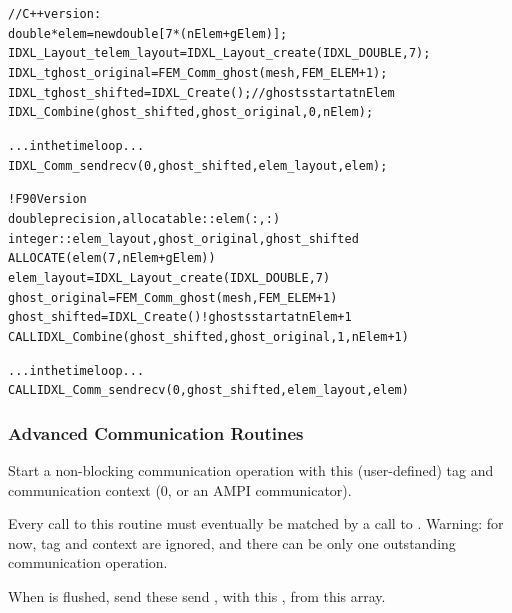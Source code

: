 \begin{alltt}
// C++ version:
     double *elem=new double[7*(nElem+gElem)];
     IDXL\_Layout\_t elem\_layout=IDXL\_Layout\_create(IDXL\_DOUBLE,7);
     IDXL\_t ghost\_original=FEM_Comm_ghost(mesh,FEM_ELEM+1);
     IDXL\_t ghost\_shifted=IDXL_Create(); // ghosts start at nElem
     IDXL_Combine(ghost_shifted,ghost_original,0,nElem);
     
     ... in the time loop ...
         IDXL_Comm_sendrecv(0,ghost_shifted,elem_layout,elem);

! F90 Version
     double precision, allocatable :: elem(:,:)
     integer :: elem\_layout, ghost_original,ghost_shifted
     ALLOCATE(elem(7,nElem+gElem))
     elem\_layout=IDXL\_Layout\_create(IDXL\_DOUBLE,7)
     ghost\_original=FEM_Comm_ghost(mesh,FEM_ELEM+1)
     ghost\_shifted=IDXL_Create() ! ghosts start at nElem+1
     CALL IDXL_Combine(ghost_shifted,ghost_original,1,nElem+1)
     
     ... in the time loop ...
         CALL IDXL_Comm_sendrecv(0,ghost_shifted,elem_layout,elem)

\end{alltt}


\subsubsection{Advanced Communication Routines}


Start a non-blocking communication operation with this (user-defined) tag and communication context (0, or an AMPI communicator).  

Every call to this routine must eventually be matched by a call to .  Warning: for now, tag and context are ignored, and there can be only one outstanding communication operation.



When  is flushed, send these send , with
this , from this  array.

